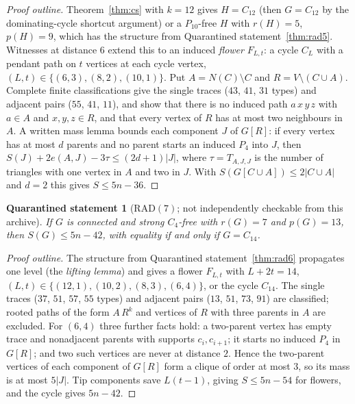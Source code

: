 \documentclass[11pt]{amsart}
\newtheorem{qrecord}[theorem]{Quarantined statement}
\theoremstyle{definition}
\theoremstyle{remark}
\newcommand{\pp}{p}
\newcommand{\RAD}{\mathrm{RAD}}
\begin{document}
\begin{proof}[Proof outline]
Theorem~\ref{thm:cs} with $k=12$ gives $H=C_{12}$ (then $G=C_{12}$ by the dominating-cycle shortcut argument) or a $P_{10}$-free $H$ with $r(H)=5$, $\pp(H)=9$, which has the structure from Quarantined statement~\ref{thm:rad5}. Witnesses at distance $6$ extend this to an induced \emph{flower} $F_{L,t}$: a cycle $C_L$ with a pendant path on $t$ vertices at each cycle vertex, $(L,t)\in\{(6,3),(8,2),(10,1)\}$. Put $A=N(C)\setminus C$ and $R=V\setminus(C\cup A)$. Complete finite classifications give the single traces ($43$, $41$, $31$ types) and adjacent pairs ($55$, $41$, $11$), and show that there is no induced path $a\,x\,y\,z$ with $a\in A$ and $x,y,z\in R$, and that every vertex of $R$ has at most two neighbours in $A$. A written mass lemma bounds each component $J$ of $G[R]$: if every vertex has at most $d$ parents and no parent starts an induced $P_4$ into $J$, then $S(J)+2e(A,J)-3\tau\le(2d+1)|J|$, where $\tau=T_{A,J,J}$ is the number of triangles with one vertex in $A$ and two in $J$. With $S(G[C\cup A])\le2|C\cup A|$ and $d=2$ this gives $S\le5n-36$.
\end{proof}

\begin{qrecord}[$\RAD(7)$; not independently checkable from this archive]\label{thm:rad7}
If $G$ is connected and strong $C_4$-free with $r(G)=7$ and $\pp(G)=13$, then $S(G)\le5n-42$, with equality if and only if $G=C_{14}$.
\end{qrecord}

\begin{proof}[Proof outline]
The structure from Quarantined statement~\ref{thm:rad6} propagates one level (the \emph{lifting lemma}) and gives a flower $F_{L,t}$ with $L+2t=14$, $(L,t)\in\{(12,1),(10,2),(8,3),(6,4)\}$, or the cycle $C_{14}$. The single traces ($37$, $51$, $57$, $55$ types) and adjacent pairs ($13$, $51$, $73$, $91$) are classified; rooted paths of the form $A\,R^k$ and vertices of $R$ with three parents in $A$ are excluded. For $(6,4)$ three further facts hold: a two-parent vertex has empty trace and nonadjacent parents with supports $c_i,c_{i+1}$; it starts no induced $P_4$ in $G[R]$; and two such vertices are never at distance $2$. Hence the two-parent vertices of each component of $G[R]$ form a clique of order at most $3$, so its mass is at most $5|J|$. Tip components save $L(t-1)$, giving $S\le5n-54$ for flowers, and the cycle gives $5n-42$.
\end{proof}
\end{document}
